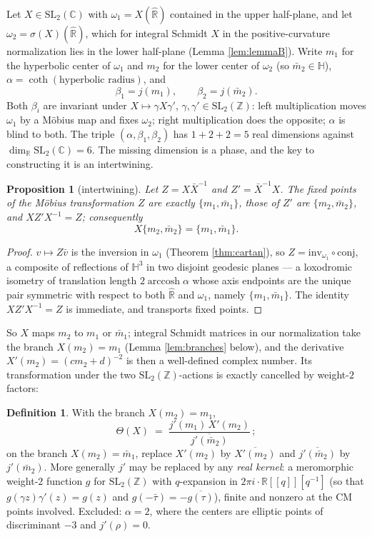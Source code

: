 \documentclass[11pt]{amsart}
\numberwithin{equation}{section}
\theoremstyle{plain}
\newtheorem{proposition}[theorem]{Proposition}
\theoremstyle{definition}
\newtheorem{definition}[theorem]{Definition}
\theoremstyle{remark}
\newcommand{\C}{\mathbb{C}}
\newcommand{\R}{\mathbb{R}}
\newcommand{\Z}{\mathbb{Z}}
\newcommand{\HH}{\mathbb{H}}
\newcommand{\Rhat}{\widehat{\R}}
\newcommand{\SL}{\mathrm{SL}}
\newcommand{\arccosh}{\operatorname{arccosh}}
\begin{document}
Let $X \in \SL_2(\C)$ with $\omega_1 = X(\Rhat)$ contained in the upper
half-plane, and let $\omega_2 = \sigma(X)(\Rhat)$, which for integral
Schmidt $X$ in the positive-curvature normalization lies in the lower
half-plane (Lemma \ref{lem:lemmaB}).  Write $m_1$ for the hyperbolic
center of $\omega_1$ and $m_2$ for the lower center of $\omega_2$ (so
$\bar m_2 \in \HH$), $\alpha = \coth(\text{hyperbolic radius})$, and
\[
  \beta_1 = j(m_1), \qquad \beta_2 = j(\bar m_2).
\]
Both $\beta_i$ are invariant under $X \mapsto \gamma X\gamma'$,
$\gamma, \gamma' \in \SL_2(\Z)$: left multiplication moves $\omega_1$
by a M\"obius map and fixes $\omega_2$; right multiplication does the
opposite; $\alpha$ is blind to both.  The triple
$(\alpha, \beta_1, \beta_2)$ has $1 + 2 + 2 = 5$ real dimensions
against $\dim_{\R}\SL_2(\C) = 6$.  The missing dimension is a phase,
and the key to constructing it is an intertwining.

\begin{proposition}[intertwining]\label{prop:intertwine}
Let $Z = X\bar X^{-1}$ and $Z' = \bar X^{-1}X$.  The fixed points of
the M\"obius transformation $Z$ are exactly $\{m_1, \bar m_1\}$, those
of $Z'$ are $\{m_2, \bar m_2\}$, and $XZ'X^{-1} = Z$; consequently
\[
  X\{m_2, \bar m_2\} = \{m_1, \bar m_1\}.
\]
\end{proposition}

\begin{proof}
$v \mapsto Z\bar v$ is the inversion in $\omega_1$ (Theorem
\ref{thm:cartan}), so $Z = \mathrm{inv}_{\omega_1}\circ\mathrm{conj}$,
a composite of reflections of $\HH^3$ in two disjoint geodesic planes
--- a loxodromic isometry of translation length $2\arccosh\alpha$
whose axis endpoints are the unique pair symmetric with respect to both
$\Rhat$ and $\omega_1$, namely $\{m_1, \bar m_1\}$.  The identity
$XZ'X^{-1} = Z$ is immediate, and transports fixed points.
\end{proof}

So $X$ maps $m_2$ to $m_1$ or $\bar m_1$; integral Schmidt matrices in
our normalization take the branch $X(m_2) = m_1$ (Lemma
\ref{lem:branches} below), and the derivative $X'(m_2) = (cm_2 +
d)^{-2}$ is then a well-defined complex number.  Its transformation
under the two $\SL_2(\Z)$-actions is exactly cancelled by weight-$2$
factors:

\begin{definition}\label{def:theta}
With the branch $X(m_2) = m_1$,
\[
  \Theta(X) \;=\;
  \frac{j'(m_1)\, X'(m_2)}{\overline{j'(\bar m_2)}}\,;
\]
on the branch $X(m_2) = \bar m_1$, replace $X'(m_2)$ by
$\overline{X'(m_2)}$ and $\overline{j'(\bar m_2)}$ by $j'(\bar m_2)$.
More generally $j'$ may be replaced by any \emph{real kernel}: a
meromorphic weight-$2$ function $g$ for $\SL_2(\Z)$ with
$q$-expansion in $2\pi i\cdot\R[[q]][q^{-1}]$ (so that
$g(\gamma z)\gamma'(z) = g(z)$ and $g(-\bar\tau) = -\overline{g(\tau)}$),
finite and nonzero at the CM points involved.  Excluded: $\alpha = 2$,
where the centers are elliptic points of discriminant $-3$ and
$j'(\rho) = 0$.
\end{definition}
\end{document}
